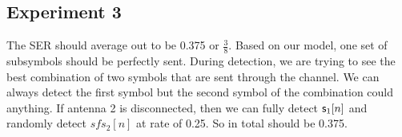\documentclass{book}
\begin{document}
\subsection{Experiment 3}
    The SER should average out to be 0.375 or $\frac{3}{8}$. Based on our model, one set of subsymbols should be perfectly sent. During detection, we are trying to see the best combination of two symbols that are sent through the channel. We can always detect the first symbol but the second symbol of the combination could anything. If antenna 2 is disconnected, then we can fully detect ${\mathsf{s}}_1[n]$ and randomly detect $sfs_2[n]$ at rate of 0.25. So in total should be 0.375.
\setlength{\baselineskip}{1pt}


\end{document}
